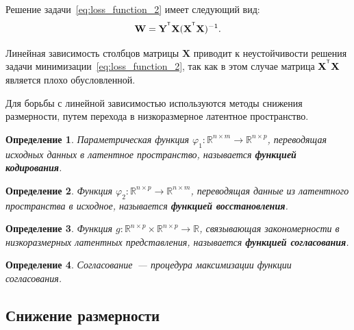 \documentclass[12pt]{article}
\newcommand{\bY}{\mathbf{Y}}
\newcommand{\bX}{\mathbf{X}}
\newcommand{\bW}{\mathbf{W}}
\newcommand{\T}{^{\text{\tiny\sffamily\upshape\mdseries T}}}
\newtheorem{definition}{Определение}[section]
\begin{document}
	\noindent Решение задачи~\eqref{eq:loss_function_2} имеет следующий вид:
	\begin{equation*}
		\bW = \bY^{\T} \bX (\bX^{\T} \bX)^{-1}.
	\end{equation*}
	
	Линейная зависимость столбцов матрицы $\bX$ приводит к неустойчивости решения задачи минимизации~\eqref{eq:loss_function_2}, так как в этом случае матрица ${\bX}^{\T} \bX$ является плохо обусловленной.
	
	\noindent Для борьбы с линейной зависимостью используются методы снижения размерности, путем перехода в низкоразмерное латентное пространство.
	
	\begin{definition}
		Параметрическая функция $\varphi_1: \mathbb{R}^{n \times m} \to \mathbb{R}^{n \times p}$, переводящая исходных данных в латентное пространство, называется \textbf{функцией кодирования}.
	\end{definition}
	
	\begin{definition}
		Функция $\varphi_2: \mathbb{R}^{n \times p} \to \mathbb{R}^{n \times m}$, переводящая данные из латентного пространства в исходное, называется \textbf{функцией восстановления}.
	\end{definition}
	
	\begin{definition}
		Функция $g: \mathbb{R}^{n \times p}\times \mathbb{R}^{n \times p} \to \mathbb{R}$, связывающая закономерности в низкоразмерных латентных представления, называется \textbf{функцией согласования}.
	\end{definition}
	
	\begin{definition}
		Согласование~--- процедура максимизации функции согласования.
	\end{definition}
	
	\subsection{Снижение размерности}
	
\end{document}
